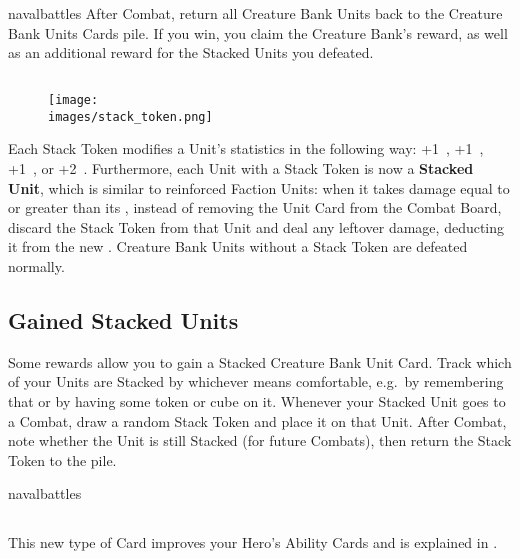 \begin{multicols*}{2}
\begin{expansion}[before=\vspace*{-11mm}]{navalbattles}
    After Combat, return all Creature Bank Units back to the Creature Bank Units Cards pile.
    If you win, you claim the Creature Bank's reward, as well as an additional reward for the Stacked Units you defeated.

    \subsection*{}
        \setlength\intextsep{0pt}
        \setlength\columnsep{1em}
        \begin{wrapfigure}{r}{0.2\linewidth}
            \texttt{[image: \\images/stack\_token.png]}
        \end{wrapfigure}
    Each Stack Token modifies a Unit's statistics in the following way: +1~, +1~, +1~, or +2~.
    Furthermore, each Unit with a Stack Token is now a \textbf{Stacked Unit}, which is similar to reinforced Faction Units: when it takes damage equal to or greater than its , instead of removing the Unit Card from the Combat Board, discard the Stack Token from that Unit and deal any leftover damage, deducting it from the new .
    Creature Bank Units without a Stack Token are defeated normally.

    \subsection*{Gained Stacked Units}
    Some rewards allow you to gain a Stacked Creature Bank Unit Card.
    Track which of your Units are Stacked by whichever means comfortable, e.g.~by remembering that or by having some token or cube on it.
    Whenever your Stacked Unit goes to a Combat, draw a random Stack Token and place it on that Unit.
    After Combat, note whether the Unit is still Stacked (for future Combats), then return the Stack Token to the pile.
\end{expansion}

\vspace*{1em}
\begin{expansion}[before=\vspace*{-11mm}]{navalbattles}
    \subsection*{}
    This new type of Card improves your Hero's Ability Cards and is explained in .


\end{expansion}
\end{multicols*}
